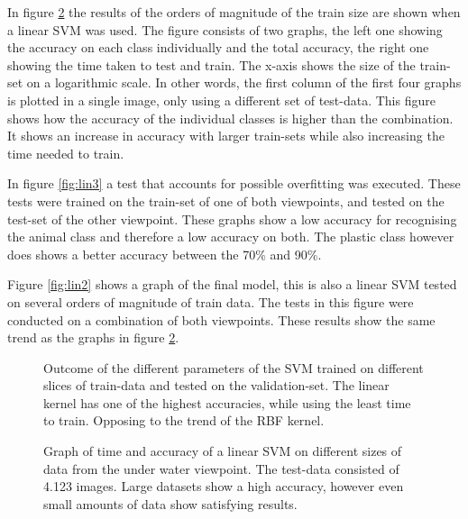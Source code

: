 In figure \ref{fig:lin1} the results of the orders of magnitude of the train size are shown when a linear SVM was used. The figure consists of two graphs, the left one showing the accuracy on each class individually and the total accuracy, the right one showing the time taken to test and train. The x-axis shows the size of the train-set on a logarithmic scale.
In other words, the first column of the first four graphs is plotted in a single image, only using a different set of test-data.
This figure shows how the accuracy of the individual classes is higher than the combination. It shows an increase in accuracy with larger train-sets while also increasing the time needed to train.

\ifx\showmixi\undefined
In figure \ref{fig:lin3} a test that accounts for possible overfitting was executed. These tests were trained on the train-set of one of both viewpoints, and tested on the test-set of the other viewpoint. These graphs show a low accuracy for recognising the animal class and therefore a low accuracy on both. The plastic class however does shows a better accuracy between the 70\% and 90\%.
\fi

Figure \ref{fig:lin2} shows a graph of the final model, this is also a linear SVM tested on several orders of magnitude of train data.
The tests in this figure were conducted on a combination of both viewpoints.
These results show the same trend as the graphs in figure \ref{fig:lin1}.

\begin{figure}%
\centering
\ifx\showfig\undefined

\vspace{-.1cm}

\vspace{-.1cm}

\vspace{-.1cm}
 \fi
\caption{Outcome of the different parameters of the SVM trained on different slices of train-data and tested on the validation-set. The linear kernel has one of the highest accuracies, while using the least time to train. Opposing to the trend of the RBF kernel.}
\label{fig:c14}
\end{figure}


\begin{figure}%
\centering
\ifx\showfig\undefined
 \fi
\caption{Graph of time and accuracy of a linear SVM on different sizes of data from the under water viewpoint. The test-data consisted of 4.123 images. Large datasets show a high accuracy, however even small amounts of data show satisfying results.}
\label{fig:lin1}
\end{figure}

